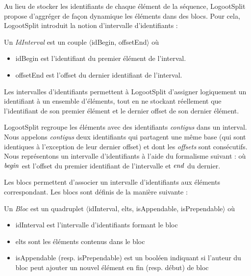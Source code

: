 \label{sec:blocs}

Au lieu de stocker les identifiants de chaque élément de la séquence, LogootSplit propose d'aggréger de façon dynamique les éléments dans des blocs.
Pour cela, LogootSplit introduit la notion d'intervalle d'identifiants :

\begin{definition}[IdInterval]
  Un \emph{IdInterval} est un couple $\langle$idBegin, offsetEnd$\rangle$ où
  \begin{itemize}
    \item idBegin est l'identifiant du premier élément de l'interval.
    \item offsetEnd est l'offset du dernier identifiant de l'interval.
  \end{itemize}
\end{definition}

Les intervalles d'identifiants permettent à LogootSplit d'assigner logiquement un identifiant à un ensemble d'éléments, tout en ne stockant réellement que l'identifiant de son premier élément et le dernier offset de son dernier élément.

LogootSplit regroupe les éléments avec des identifiants \emph{contigus} dans un interval.
Nous appelons \emph{contigus} deux identifiants qui partagent une même base (\ie qui sont identiques à l'exception de leur dernier offset) et dont les \emph{offsets} sont consécutifs.
Nous représentons un intervalle d'identifiants à l'aide du formalisme suivant :  où $\mathit{begin}$ est l'offset du premier identifiant de l'intervalle et $\mathit{end}$ du dernier.

Les blocs permettent d'associer un intervalle d'identifiants aux éléments correspondant.
Les blocs sont définis de la manière suivante :

\begin{definition}[Bloc]
  Un \emph{Bloc} est un quadruplet $\langle$idInterval, elts, isAppendable, isPrependable$\rangle$ où
  \begin{itemize}
    \item idInterval est l'intervalle d'identifiants formant le bloc
    \item elts sont les éléments contenus dans le bloc
    \item isAppendable (resp. isPrependable) est un booléen indiquant si l'auteur du bloc peut ajouter un nouvel élément en fin (resp. début) de bloc
  \end{itemize}
\end{definition}

